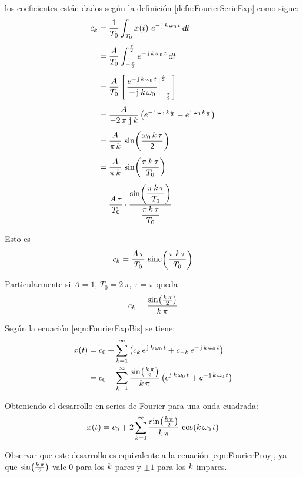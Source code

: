 \begin{mdframed}[style=ExampleFrame]
    los coeficientes están dados según la definición \ref{defn:FourierSerieExp} como sigue:
    \begin{align*}
        c_\kth &= \frac{1}{T_0} \int_{T_0} \fx[x]{t} \, e^{-\iu \, \kth \, \omega_0 \, t} \, \dif t
        \\[1ex]
        &= \frac{A}{T_0} \int_{-\frac{\tau}{2}}^{\frac{\tau}{2}} e^{-\iu \, \kth \, \omega_0 \, t} \, \dif t
        \\[1ex]
        &= \frac{A}{T_0} \barrow{\dfrac{e^{-\iu \, \kth \, \omega_0 \, t}}{-\iu \, \kth \, \omega_0}}{-\frac{\tau}{2}}{\frac{\tau}{2}}
        \\[1ex]
        &= \frac{A}{-2 \, \pi \, \iu \, \kth } \inParentheses{ e^{ -\iu \, \omega_0 \, \kth \frac{\tau}{2}} - e^{ \iu \, \omega_0 \, \kth \frac{\tau}{2}} }
        \\[1ex]
        &= \frac{A}{\pi \, \kth} \, \fx[\sin]{\frac{\omega_0 \, \kth \, \tau}{2}}
        \\[1ex]
        &= \frac{A}{\pi \, \kth} \, \fx[\sin]{\frac{\pi \, \kth \, \tau}{T_0}}
        \\[1ex]
        &= \frac{A \, \tau}{T_0} \cdot
        \frac{ \fx[\sin]{\dfrac{\pi \, \kth \, \tau}{T_0}} }{ \dfrac{\pi \, \kth \, \tau}{T_0} }
    \end{align*}

    Esto es
    \[
        c_\kth = \frac{A \, \tau}{T_0} \, \fx[\sinc]{\frac{\pi \, \kth \, \tau}{T_0}}
    \]

    Particularmente si $A=1$, $T_0=2\,\pi$, $\tau=\pi$ queda
    \[
        c_\kth = \frac{ \fx[\sin]{\frac{\kth \, \pi}{2}} }{\kth \, \pi}
    \]

    Según la ecuación \ref{eqn:FourierExpBis} se tiene:
    \begin{align*}
        \fx[x]{t} &= c_0 + \sum_{\kth=1}^{\infty} \inParentheses{ c_\kth \, e^{\iu \, \kth \, \omega_0 \, t} + c_{-\kth} \, e^{-\iu \, \kth \, \omega_0 \, t} }
        \\
        &= c_0 + \sum_{\kth=1}^{\infty} \frac{\fx[\sin]{\frac{\kth \, \pi}{2}}}{\kth \, \pi} \inParentheses{ e^{\iu \, \kth \, \omega_0 \, t} + e^{-\iu \, \kth \, \omega_0 \, t} }
    \end{align*}

    Obteniendo el desarrollo en series de Fourier para una onda cuadrada:
    \[
        \fx[x]{t} = c_0 + 2 \sum_{\kth=1}^{\infty} \frac{\fx[\sin]{\frac{\kth \, \pi}{2}}}{\kth \, \pi} \, \fx[\cos]{\kth \, \omega_0 \, t}
    \]

    Observar que este desarrollo es equivalente a la ecuación \ref{eqn:FourierProy}, ya que $\fx[\sin]{\frac{\kth \, \pi}{2}}$ vale 0 para los $\kth$ pares y $\pm1$ para los $\kth$ impares.
\end{mdframed}


